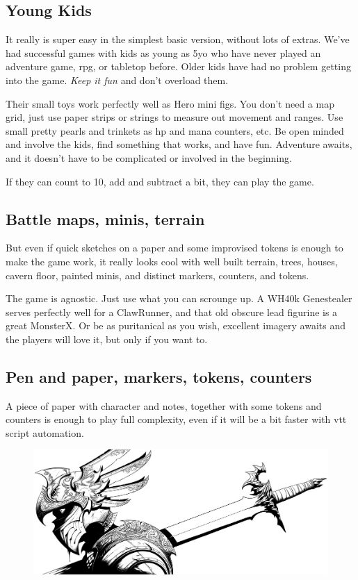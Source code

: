 \subsection*{Young Kids}

It really is super easy in the simplest basic version, without lots of extras. We've had successful games with kids as young as 5yo who have never played an adventure game, rpg, or tabletop before. Older kids have had no problem getting into the game. \emph{Keep it fun} and don't overload them.

Their small toys work perfectly well as Hero mini figs. You don't need a map grid, just use paper strips or strings to measure out movement and ranges. Use small pretty pearls and trinkets as hp and mana counters, etc. Be open minded and involve the kids, find something that works, and have fun. Adventure awaits, and it doesn't have to be complicated or involved in the beginning.

If they can count to 10, add and subtract a bit, they can play the game.


\subsection*{Battle maps, minis, terrain}

But even if quick sketches on a paper and some improvised tokens is enough to make the game work, it really looks cool with well built terrain, trees, houses, cavern floor, painted minis, and distinct markers, counters, and tokens.

The game is agnostic. Just use what you can scrounge up. A WH40k Genestealer serves perfectly well for a ClawRunner, and that old obscure lead figurine is a great MonsterX.
Or be as puritanical as you wish, excellent imagery awaits and the players will love it, but only if you want to.


\subsection*{Pen and paper, markers, tokens, counters}

A piece of paper with character and notes, together with some tokens and counters is enough to play full complexity, even if it will be a bit faster with vtt script automation.


\begin{figure}[b]
\centering
\includegraphics[width=120mm]{./fig/deadhero.jpg}
\end{figure}








